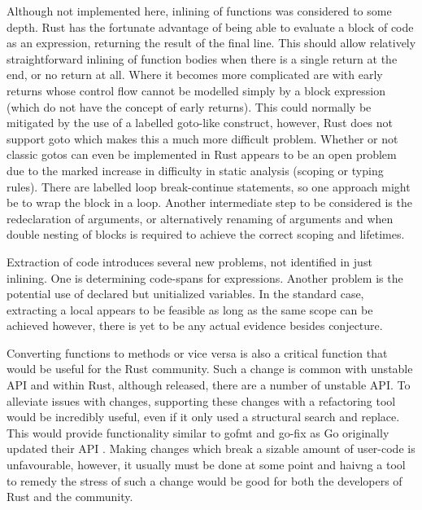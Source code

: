 
Although not implemented here, inlining of functions was considered to some depth. Rust has the fortunate advantage of being able to evaluate a block of code as an expression, returning the result of the final line. This should allow relatively straightforward inlining of function bodies when there is a single return at the end, or no return at all. Where it becomes more complicated are with early returns whose control flow cannot be modelled simply by a block expression (which do not have the concept of early returns). This could normally be mitigated by the use of a labelled goto-like construct, however, Rust does not support goto which makes this a much more difficult problem. Whether or not classic gotos can even be implemented in Rust appears to be an open problem due to the marked increase in difficulty in static analysis (scoping or typing rules). There are labelled loop break-continue statements, so one approach might be to wrap the block in a loop. Another intermediate step to be considered is the redeclaration of arguments, or alternatively renaming of arguments and when double nesting of blocks is required to achieve the correct scoping and lifetimes.

Extraction of code introduces several new problems, not identified in just inlining. One is determining code-spans for expressions. Another problem is the potential use of declared but unitialized variables. In the standard case, extracting a local appears to be feasible as long as the same scope can be achieved however, there is yet to be any actual evidence besides conjecture.


Converting functions to methods or vice versa is also a critical function that would be useful for the Rust community. Such a change is common with unstable API and within Rust, although released, there are a number of unstable API. To alleviate issues with changes, supporting these changes with a refactoring tool would be incredibly useful, even if it only used a structural search and replace. This would provide functionality similar to gofmt and go-fix as Go originally updated their API \cite{gofix11}. Making changes which break a sizable amount of user-code is unfavourable, however, it usually must be done at some point and haivng a tool to remedy the stress of such a change would be good for both the developers of Rust and the community.


